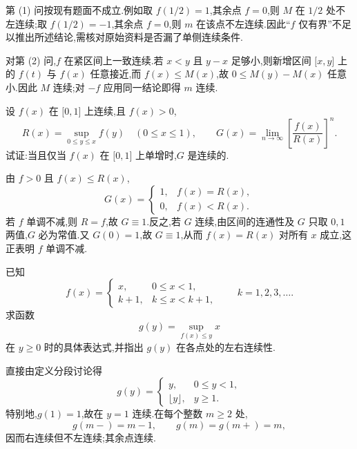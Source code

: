 \begin{solution}
    第 (1) 问按现有题面不成立.例如取 $f(1/2)=1$,其余点 $f=0$,则 $M$ 在 $1/2$ 处不左连续;取 $f(1/2)=-1$,其余点 $f=0$,则 $m$ 在该点不左连续.因此“$f$ 仅有界”不足以推出所述结论,需核对原始资料是否漏了单侧连续条件.

    对第 (2) 问,$f$ 在紧区间上一致连续.若 $x<y$ 且 $y-x$ 足够小,则新增区间 $\lbrack x,y\rbrack$ 上的 $f(t)$ 与 $f(x)$ 任意接近,而 $f(x)\leq M(x)$,故 $0\leq M(y)-M(x)$ 任意小.因此 $M$ 连续;对 $-f$ 应用同一结论即得 $m$ 连续.
\end{solution}

\begin{example}
    设 $f(x)$ 在 $\lbrack 0,1\rbrack$ 上连续,且 $f(x)>0$,
    \[
        R(x)=\sup\limits_{0\leq y\leq x}f(y)\quad(0\leq x\leq1),
        \qquad
        G(x)=\lim\limits_{n\to\infty}\left[\dfrac{f(x)}{R(x)}\right]^n.
    \]
    试证:当且仅当 $f(x)$ 在 $\lbrack 0,1\rbrack$ 上单增时,$G$ 是连续的.
\end{example}
\exampleblank

\begin{solution}
    由 $f>0$ 且 $f(x)\leq R(x)$,
    \[
        G(x)=
        \begin{cases}
            1, & f(x)=R(x), \\
            0, & f(x)<R(x).
        \end{cases}
    \]
    若 $f$ 单调不减,则 $R=f$,故 $G\equiv1$.反之,若 $G$ 连续,由区间的连通性及 $G$ 只取 $0,1$ 两值,$G$ 必为常值.又 $G(0)=1$,故 $G\equiv1$,从而 $f(x)=R(x)$ 对所有 $x$ 成立,这正表明 $f$ 单调不减.
\end{solution}

\begin{example}
    已知
    \[
        f(x)=
        \begin{cases}
            x,   & 0\leq x<1,   \\
            k+1, & k\leq x<k+1,
        \end{cases}
        \qquad k=1,2,3,\ldots.
    \]
    求函数
    \[
        g(y)=\sup\limits_{f(x)\leq y}x
    \]
    在 $y\geq0$ 时的具体表达式,并指出 $g(y)$ 在各点处的左右连续性.
\end{example}
\exampleblank

\begin{solution}
    直接由定义分段讨论得
    \[
        g(y)=
        \begin{cases}
            y,                & 0\leq y<1, \\
            \lfloor y\rfloor, & y\geq1.
        \end{cases}
    \]
    特别地,$g(1)=1$,故在 $y=1$ 连续.在每个整数 $m\geq2$ 处,
    \[
        g(m-)=m-1,\qquad g(m)=g(m+)=m,
    \]
    因而右连续但不左连续;其余点连续.
\end{solution}



